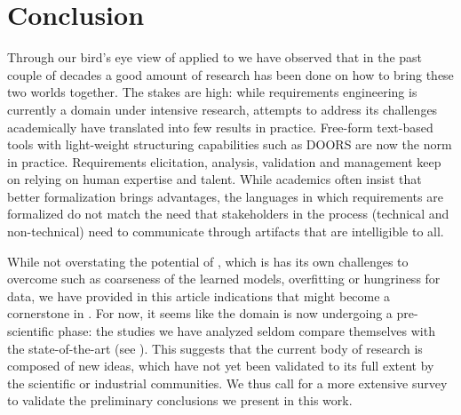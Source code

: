 \section{Conclusion}
\label{sec:conclusion}


Through our bird's eye view of \ML applied to \RE we have observed that in the
past couple of decades a good amount of research has been done on how to bring
these two worlds together. The stakes are high: while requirements engineering
is currently a domain under intensive research, attempts to address its
challenges academically have translated into few results in practice. Free-form
text-based tools with light-weight structuring capabilities such as DOORS are
now the norm in practice. Requirements elicitation, analysis, validation and
management keep on relying on human expertise and talent. While academics often insist that
better formalization brings advantages, the languages in which requirements are
formalized do not match the need that stakeholders in the \RE process
(technical and non-technical) need to communicate through artifacts that are
intelligible to all.

While not overstating the potential of \ML, which is has its own challenges to
overcome such as coarseness of the learned models, overfitting or hungriness
for data, we have provided in this article indications that \ML might become a cornerstone in \RE. For now, it
seems like the domain is now undergoing a pre-scientific phase: the studies we
have analyzed seldom compare themselves with the state-of-the-art (see
). This suggests that the current body of research is composed of
new ideas, which have not yet been validated to its full extent by the
scientific or industrial communities. We thus call for a more extensive survey to validate
the preliminary conclusions we present in this work.
